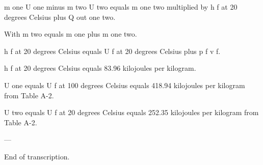 m one U one minus m two U two equals m one two multiplied by h f at 20 degrees Celsius plus Q out one two.  

With m two equals m one plus m one two.  

h f at 20 degrees Celsius equals U f at 20 degrees Celsius plus p f v f.  

h f at 20 degrees Celsius equals 83.96 kilojoules per kilogram.  

U one equals U f at 100 degrees Celsius equals 418.94 kilojoules per kilogram from Table A-2.  

U two equals U f at 20 degrees Celsius equals 252.35 kilojoules per kilogram from Table A-2.  

---  

End of transcription.